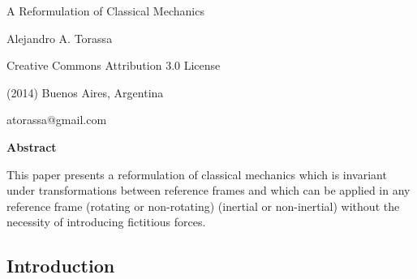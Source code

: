 \documentclass[10pt]{article}
\begin{document}
\begin{center}

{\LARGE A Reformulation of Classical Mechanics}

\bigskip \bigskip

{\large Alejandro A. Torassa}

\bigskip \bigskip

\small

Creative Commons Attribution 3.0 License

(2014) Buenos Aires, Argentina

atorassa@gmail.com

\bigskip \medskip

{\fontsize{9.27}{11.01}\selectfont\textbf{Abstract}}

\bigskip

\parbox{99.12mm}{\fontsize{9.27}{11.01}\selectfont This paper presents a reformulation of classical mechanics which is invariant under transformations between reference frames and which can be applied in any reference frame (rotating or non-rotating) (inertial or non-inertial) \hbox {without} the necessity of introducing fictitious forces.}

\end{center}

\normalsize

\vspace{-0.30em}

{\centering\subsection*{Introduction}}

\vspace{+1.20em}
\end{document}
